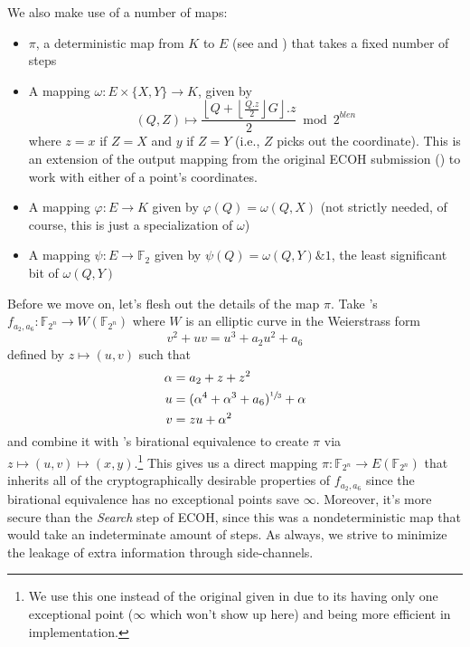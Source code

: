 We also make use of a number of maps:
\begin{itemize}
\item   $\pi$, a deterministic map from $K$ to $E$ (see \cite{icart2009hash}
    and \cite{moloneyefficient}) that takes a fixed number of steps
\item   A mapping $\omega: E \times \{X, Y\} \to K$, given by
\[
(Q, Z) \mapsto \frac{\left\lfloor Q + \left\lfloor \frac{Q.z}{2} \right\rfloor
    G \right\rfloor.z}{2} \bmod 2^{blen}
\]
    where $z = x$ if $Z = X$ and $y$ if $Z = Y$ (i.e., $Z$ picks out the
    coordinate).
This is an extension of the output mapping from the original ECOH submission
    (\cite{brown2008ecoh}) to work with either of a point's coordinates.
\item   A mapping $\varphi: E \to K$ given by $\varphi(Q) = \omega(Q, X)$ (not
    strictly needed, of course, this is just a specialization of $\omega$)
\item   A mapping $\psi: E \to \mathbb{F}_2$ given by $\psi(Q) = \omega(Q, Y)
    \& 1$, the least significant bit of $\omega(Q, Y)$
\end{itemize}
Before we move on, let's flesh out the details of the map $\pi$.
Take \cite{icart2009hash}'s $f_{a_2, a_6}:\mathbb{F}_{2^n} \to
    W(\mathbb{F}_{2^n})$ where $W$ is an elliptic curve in the Weierstrass form
\[
v^2 + uv = u^3 + a_2u^2 + a_6
\]
    defined by $z \mapsto (u, v)$ such that
\begin{align*}
\alpha  &=  a_2 + z + z^2\\
u       &=  (\alpha^4 + \alpha^3 + a_6)^{\sfrac{1}{3}} + \alpha\\
v       &=  zu + \alpha^2
\end{align*}
    and combine it with \cite{moloneyefficient}'s birational equivalence to
    create $\pi$ via $z \mapsto (u, v) \mapsto (x, y)$.\footnote{We use this
    one instead of the original given in \cite{bernstein2008binary} due to its
    having only one exceptional point ($\infty$ which won't show up here) and
    being more efficient in implementation.} 
This gives us a direct mapping $\pi: \mathbb{F}_{2^n} \to E(\mathbb{F}_{2^n})$
    that inherits all of the cryptographically desirable properties of
    $f_{a_2, a_6}$ since the birational equivalence has no exceptional points
    save $\infty$.
Moreover, it's more secure than the \textit{Search} step of ECOH, since this
    was a nondeterministic map that would take an indeterminate amount of
    steps.
As always, we strive to minimize the leakage of extra information through
    side-channels.

